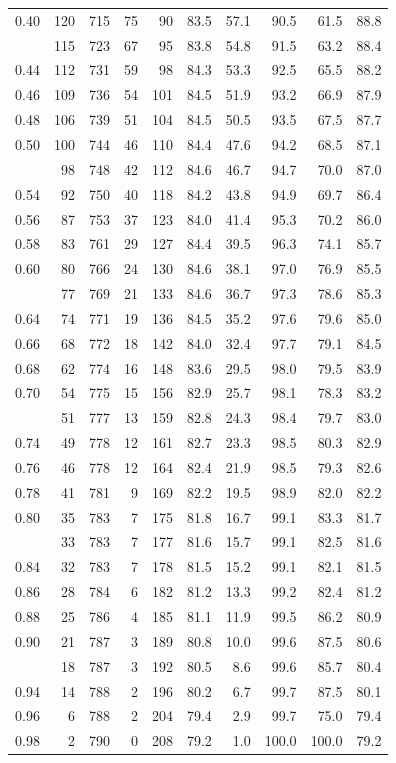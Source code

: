 \documentclass[
  11pt,
  letterpaper,
]{book}
\theoremstyle{definition}
\theoremstyle{remark}
\begin{document}
\begin{longtable}{rrrrrrrrrr}
0.40 & 120 & 715 & 75 & 90 & 83.5 & 57.1 & 90.5 & 61.5 & 88.8\\
\addlinespace
0.42 & 115 & 723 & 67 & 95 & 83.8 & 54.8 & 91.5 & 63.2 & 88.4\\
0.44 & 112 & 731 & 59 & 98 & 84.3 & 53.3 & 92.5 & 65.5 & 88.2\\
0.46 & 109 & 736 & 54 & 101 & 84.5 & 51.9 & 93.2 & 66.9 & 87.9\\
0.48 & 106 & 739 & 51 & 104 & 84.5 & 50.5 & 93.5 & 67.5 & 87.7\\
0.50 & 100 & 744 & 46 & 110 & 84.4 & 47.6 & 94.2 & 68.5 & 87.1\\
\addlinespace
0.52 & 98 & 748 & 42 & 112 & 84.6 & 46.7 & 94.7 & 70.0 & 87.0\\
0.54 & 92 & 750 & 40 & 118 & 84.2 & 43.8 & 94.9 & 69.7 & 86.4\\
0.56 & 87 & 753 & 37 & 123 & 84.0 & 41.4 & 95.3 & 70.2 & 86.0\\
0.58 & 83 & 761 & 29 & 127 & 84.4 & 39.5 & 96.3 & 74.1 & 85.7\\
0.60 & 80 & 766 & 24 & 130 & 84.6 & 38.1 & 97.0 & 76.9 & 85.5\\
\addlinespace
0.62 & 77 & 769 & 21 & 133 & 84.6 & 36.7 & 97.3 & 78.6 & 85.3\\
0.64 & 74 & 771 & 19 & 136 & 84.5 & 35.2 & 97.6 & 79.6 & 85.0\\
0.66 & 68 & 772 & 18 & 142 & 84.0 & 32.4 & 97.7 & 79.1 & 84.5\\
0.68 & 62 & 774 & 16 & 148 & 83.6 & 29.5 & 98.0 & 79.5 & 83.9\\
0.70 & 54 & 775 & 15 & 156 & 82.9 & 25.7 & 98.1 & 78.3 & 83.2\\
\addlinespace
0.72 & 51 & 777 & 13 & 159 & 82.8 & 24.3 & 98.4 & 79.7 & 83.0\\
0.74 & 49 & 778 & 12 & 161 & 82.7 & 23.3 & 98.5 & 80.3 & 82.9\\
0.76 & 46 & 778 & 12 & 164 & 82.4 & 21.9 & 98.5 & 79.3 & 82.6\\
0.78 & 41 & 781 & 9 & 169 & 82.2 & 19.5 & 98.9 & 82.0 & 82.2\\
0.80 & 35 & 783 & 7 & 175 & 81.8 & 16.7 & 99.1 & 83.3 & 81.7\\
\addlinespace
0.82 & 33 & 783 & 7 & 177 & 81.6 & 15.7 & 99.1 & 82.5 & 81.6\\
0.84 & 32 & 783 & 7 & 178 & 81.5 & 15.2 & 99.1 & 82.1 & 81.5\\
0.86 & 28 & 784 & 6 & 182 & 81.2 & 13.3 & 99.2 & 82.4 & 81.2\\
0.88 & 25 & 786 & 4 & 185 & 81.1 & 11.9 & 99.5 & 86.2 & 80.9\\
0.90 & 21 & 787 & 3 & 189 & 80.8 & 10.0 & 99.6 & 87.5 & 80.6\\
\addlinespace
0.92 & 18 & 787 & 3 & 192 & 80.5 & 8.6 & 99.6 & 85.7 & 80.4\\
0.94 & 14 & 788 & 2 & 196 & 80.2 & 6.7 & 99.7 & 87.5 & 80.1\\
0.96 & 6 & 788 & 2 & 204 & 79.4 & 2.9 & 99.7 & 75.0 & 79.4\\
0.98 & 2 & 790 & 0 & 208 & 79.2 & 1.0 & 100.0 & 100.0 & 79.2\\
\bottomrule
\end{longtable}
\end{document}
